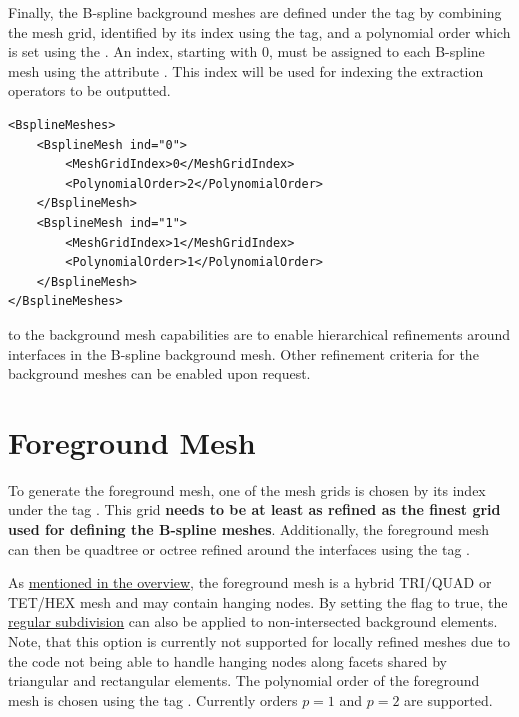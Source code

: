 \hypertarget{bspline_mesh_definition}{}
Finally, the B-spline background meshes are defined under the tag  by combining the mesh grid, identified by its index using the  tag, and a polynomial order which is set using the . An index, starting with $0$, must be assigned to each B-spline mesh using the attribute . This index will be used for indexing the extraction operators to be outputted.

\begin{minipage}{\linewidth}
\vspace{0.5cm}
\begin{lstlisting}[caption={Definition of a multiple mesh grids},captionpos=b, label={lst:bsp_meshes}]
<BsplineMeshes>
    <BsplineMesh ind="0">
        <MeshGridIndex>0</MeshGridIndex>
        <PolynomialOrder>2</PolynomialOrder>
    </BsplineMesh>
    <BsplineMesh ind="1">
        <MeshGridIndex>1</MeshGridIndex>
        <PolynomialOrder>1</PolynomialOrder>
    </BsplineMesh>
</BsplineMeshes>
\end{lstlisting}
\end{minipage}

 to the background mesh capabilities are to enable hierarchical refinements around interfaces in the B-spline background mesh. Other refinement criteria for the background meshes can be enabled upon request.

\section{Foreground Mesh}
\label{sec:tutorial_foreground}

To generate the foreground mesh, one of the mesh grids is chosen by its index under the tag . This grid \textbf{needs to be at least as refined as the finest grid used for defining the B-spline meshes}. Additionally, the foreground mesh can then be quadtree or octree refined around the interfaces using the tag .

As \hyperlink{foreground_mesh_properties}{mentioned in the overview}, the foreground mesh is a hybrid TRI/QUAD or TET/HEX mesh and may contain hanging nodes. By setting the flag  to true, the \hyperlink{regular_subdivision}{regular subdivision} can also be applied to non-intersected background elements. Note, that this option is currently not supported for locally refined meshes due to the code not being able to handle hanging nodes along facets shared by triangular and rectangular elements. The polynomial order of the foreground mesh is chosen using the tag . Currently orders $p=1$ and $p=2$ are supported.

